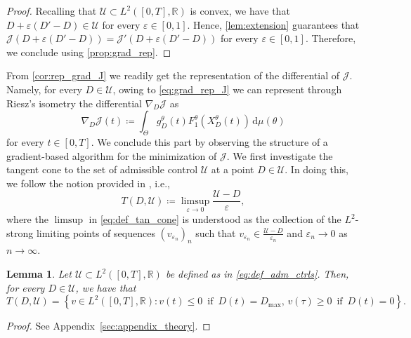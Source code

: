 \documentclass[a4paper,12pt, reqno]{amsart}
\theoremstyle{plain}
\newtheorem{lemma}[theorem]{Lemma}
\theoremstyle{definition}
\theoremstyle{remark}
\numberwithin{equation}{section}
\newcommand{\J}{\mathcal{J}}
\newcommand{\R}{\mathbb{R}}
\newcommand{\U}{\mathcal{U}}
\newcommand{\e}{\varepsilon}
\newcommand{\de}{\,\mathrm{d}}
\begin{document}
\begin{proof}
    Recalling that $\U\subset L^2([0,T],\R)$ is convex, we have that ${D+\e(D'-D)}\in\U$ for every $\e\in[0,1]$. Hence, \cref{lem:extension} guarantees that $\J({D+\e(D'-D)})=\J'({D+\e(D'-D)})$ for every $\e\in[0,1]$. Therefore, we conclude using \cref{prop:grad_rep}.
\end{proof}

From \cref{cor:rep_grad_J} we readily get the representation of the differential of $\J$. Namely, for every ${D}\in\U$, owing to \cref{eq:grad_rep_J} we can represent through Riesz's isometry the differential $\nabla_{D}\J$ as
\begin{equation} \label{eq:grad_J}
    \nabla_{D} \J ({t}) \coloneqq 
    \int_\Theta
         {g_D^\theta}({t}) 
         F_1^\theta \left( {X_D^\theta}({t}) \right)
         \de \mu(\theta)
\end{equation}
for every ${t} \in [0,T]$.
We conclude this part by observing the structure of a gradient-based algorithm for the minimization of $\J$.
We first investigate the tangent cone to the set of admissible control $\U$ at a point ${D}\in\U$.
In doing this, we follow the notion provided in \cite[Definition~1.8]{mordukhovich2006variational1}, i.e.,
\begin{equation}\label{eq:def_tan_cone}
    T({D},\U) \coloneqq \limsup_{\e \to 0}\frac{\U- {D}}{\e},
\end{equation}
where the $\limsup$ in \cref{eq:def_tan_cone} is understood as the collection of the $L^2$-strong limiting points of sequences $(v_{\e_n})_n$ such that $v_{\e_n}\in \frac{\U- {D}}{\e_n}$ and $\e_n\to 0$ as $n\to\infty$.

\begin{lemma} \label{lem:tangent_domain}
    Let $\U \subset L^2([0,T],\R)$ be defined as in \cref{eq:def_adm_ctrls}. 
    Then, for every ${D}\in\U$, we have that 
    \begin{equation} \label{eq:char_tangent}
    T({D},\U) = \left\{ 
    v \in L^2([0,T],\R) :   v({t}) \leq 0 \,\,\, \mathrm{ if }\,\,\,  {D}({t})={D_{\max}},\,
    v(\tau) \geq 0 \,\,\, \mathrm{ if }\,\,\, {D}({t})=0
    \right\}    .
    \end{equation}
\end{lemma}
\begin{proof}
    See {Appendix}~\ref{sec:appendix_theory}.
\end{proof}
\end{document}

